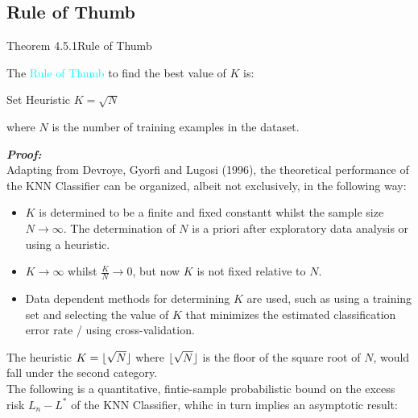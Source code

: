 \documentclass{book}
\DeclarePairedDelimiter\floor{\lfloor}{\rfloor}
\begin{document}
\subsection{Rule of Thumb}
\begin{thmBox}{Theorem 4.5.1}{Rule of Thumb}
    \raggedright
    The \textcolor{cyan}{Rule of Thumb} to find the best value of \(K\) is: \\
    \begin{center}
        Set Heuristic \(K = \sqrt{N}\) \\
    \end{center}
    where \(N\) is the number of training examples in the dataset.
\end{thmBox}
\newpage
\textbf{\large{\textit{Proof:}}}\\
Adapting from Devroye, Gyorfi and Lugosi (1996), the theoretical performance of the KNN Classifier can be organized, albeit not exclusively, in the following way:
\begin{itemize}
    \item \(K\) is determined to be a finite and fixed constantt whilst the sample size \(N \rightarrow \infty\). The determination of \(N\) is a priori after exploratory data analysis or using a heuristic.
    \item \(K \rightarrow \infty\) whilst \(\frac{K}{N} \rightarrow 0\), but now \(K\) is not fixed relative to \(N\).
    \item Data dependent methods for determining \(K\) are used, such as using a training set and selecting the value of \(K\) that minimizes the estimated classification error rate / using cross-validation.
\end{itemize}
The heuristic \(K = \floor{\sqrt{N}}\) where \(\floor{\sqrt{N}}\) is the floor of the square root of \(N\), would fall under the second category.\\
The following is a quantitative, fintie-sample probabilistic bound on the excess risk \(L_n - L^*\) of the KNN Classifier, whihc in turn implies an asymptotic result: \\
\end{document}
